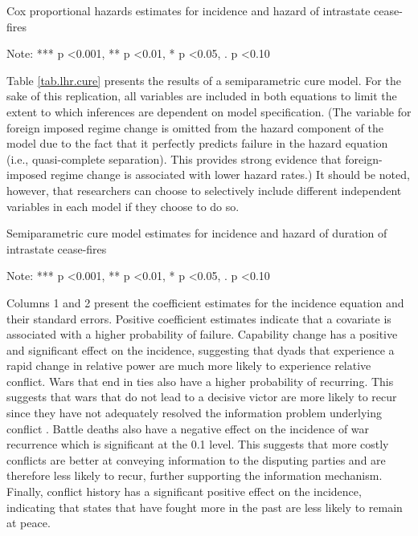\documentclass[letterpaper, 12pt]{article}
\let\originaltable\table
\let\endoriginaltable\endtable
\renewenvironment{table}[1][ht]{%
	\originaltable[#1]
	\centering}%
{\endoriginaltable}
\theoremstyle{plain}
\begin{document}
\begin{table}
	\caption{Cox proportional hazards estimates for incidence and hazard of intrastate cease-fires} 
	\label{tab.lhr.cox}
	
	Note: *** p \textless 0.001, ** p \textless 0.01, * p \textless 0.05, . p \textless 0.10
\end{table}

Table \ref{tab.lhr.cure} presents the results of a semiparametric cure model. For the sake of this replication, all variables are included in both equations to limit the extent to which inferences are dependent on model specification. (The variable for foreign imposed regime change is omitted from the hazard component of the model due to the fact that it perfectly predicts failure in the hazard equation (i.e., quasi-complete separation). This provides strong evidence that foreign-imposed regime change is associated with lower hazard rates.) It should be noted, however, that researchers can choose to selectively include different independent variables in each model if they choose to do so. 

\begin{table}
	\caption{Semiparametric cure model estimates for incidence and hazard of duration of intrastate cease-fires} 
	\label{tab.lhr.cure}
	
	Note: *** p \textless 0.001, ** p \textless 0.01, * p \textless 0.05, . p \textless 0.10
\end{table}

Columns 1 and 2 present the coefficient estimates for the incidence equation and their standard errors. Positive coefficient estimates indicate that a covariate is associated with a higher probability of failure. Capability change has a positive and significant effect on the incidence, suggesting that dyads that experience a rapid change in relative power are much more likely to experience relative conflict. Wars that end in ties also have a higher probability of recurring. This suggests that wars that do not lead to a decisive victor are more likely to recur since they have not adequately resolved the information problem underlying conflict \citep{fearon1995}. Battle deaths also have a negative effect on the incidence of war recurrence which is significant at the 0.1 level. This suggests that more costly conflicts are better at conveying information to the disputing parties and are therefore less likely to recur, further supporting the information mechanism. Finally, conflict history has a significant positive effect on the incidence, indicating that states that have fought more in the past are less likely to remain at peace.
\end{document}
